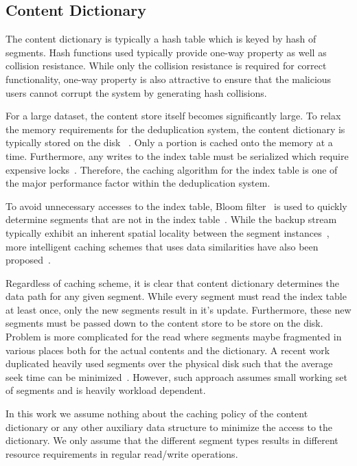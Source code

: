 \subsection{Content Dictionary}
The content dictionary is typically a hash table which is keyed by hash of segments. Hash functions used typically provide one-way property as well as collision resistance. While only the collision resistance is required for correct functionality, one-way property is also attractive to ensure that the malicious users cannot corrupt the system by generating hash collisions.

For a large dataset, the content store itself becomes significantly large.
To relax the memory requirements for the deduplication system, the content dictionary is typically stored on the disk~\cite{mandagere:2008, lillibridge:2009, zhu:2008, bhagwat:2009} .
Only a portion is cached onto the memory at a time. Furthermore, any writes to the index table must be serialized which require expensive locks~\cite{clements:2009}. Therefore, the caching algorithm for the index table is one of the major performance factor within the deduplication system.

To avoid unnecessary accesses to the index table, Bloom filter~\cite{bloom:1970} is used to quickly determine segments that are not in the index table~\cite{zhu:2008}. While the backup stream typically exhibit an inherent spatial locality between the segment instances~\cite{zhu:2008}, more intelligent caching schemes that uses data similarities have also been proposed~\cite{lillibridge:2009, bhagwat:2009}.

Regardless of caching scheme, it is clear that content dictionary determines the data path for any given segment. While every segment must read the index table at least once, only the new segments result in it's update. Furthermore, these new segments must be passed down to the content store to be store on the disk. Problem is more complicated for the read where segments maybe fragmented in various places both for the actual contents and the dictionary. A recent work duplicated heavily used segments over the physical disk such that the average seek time can be minimized~\cite{koller:2010}. However, such approach assumes small working set of segments and is heavily workload dependent.

In this work we assume nothing about the caching policy of the content dictionary or any other auxiliary data structure to minimize the access to the dictionary. We only assume that the different segment types results in different resource requirements in regular read/write operations.

